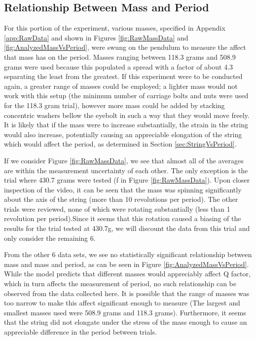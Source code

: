 \documentclass[11pt]{article}
\begin{document}
        \subsection{Relationship Between Mass and Period}\label{sec:PeriodVsMass}
        For this portion of the experiment, various masses, specified in Appendix \ref{app:RawData} and shown in Figures \ref{fig:RawMassData} and \ref{fig:AnalyzedMassVsPeriod}, were swung on the pendulum to measure the affect that mass has on the period. Masses ranging between 118.3 grams and 508.9 grams were used because this populated a spread with a factor of about 4.3 separating the least from the greatest. If this experiment were to be conducted again, a greater range of masses could be employed; a lighter mass would not work with this setup (the minimum number of carriage bolts and nuts were used for the 118.3 gram trial), however more mass could be added by stacking concentric washers bellow the eyebolt in such a way that they would move freely. It is likely that if the mass were to increase substantially, the strain in the string would also increase, potentially causing an appreciable elongation of the string which would affect the period, as determined in Section \ref{sec:StringVsPeriod}. 

        If we consider Figure \ref{fig:RawMassData}, we see that almost all of the averages are within the measurement uncertainty of each other. The only exception is the trial where 430.7 grams were tested (f in Figure \ref{fig:RawMassData}). Upon closer inspection of the video, it can be seen that the mass was spinning significantly about the axis of the string (more than 10 revolutions per period). The other trials were reviewed, none of which were rotating substantially (less than 1 revolution per period).Since it seems that this rotation caused a biasing of the results for the trial tested at 430.7g, we will discount the data from this trial and only consider the remaining 6.

        From the other 6 data sets, we see no statistically significant relationship between mass and mass and period, as can be seen in Figure \ref{fig:AnalyzedMassVsPeriod}. While the model predicts that different masses would appreciably affect Q factor, which in turn affects the measurement of period, no such relationship can be observed from the data collected here. It is possible that the range of masses was too narrow to make this affect significant enough to measure (The largest and smallest masses used were 508.9 grams and 118.3 grams). Furthermore, it seems that the string did not elongate under the stress of the mass enough to cause an appreciable difference in the period between trials.
\end{document}
